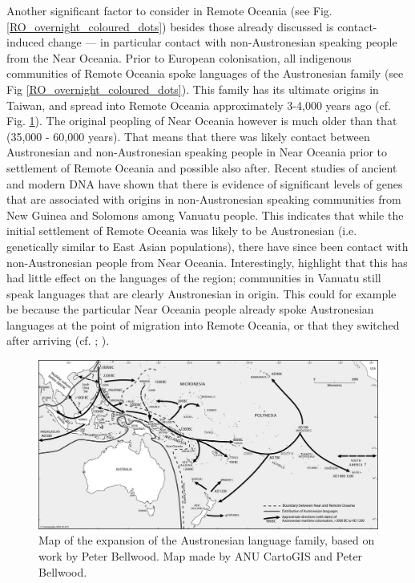 \documentclass[unnumsec,webpdf,modern,medium]{oup-authoring-template}
\begin{document}
Another significant factor to consider in Remote Oceania (see Fig. \ref{RO_overnight_coloured_dots}) besides those already discussed is contact-induced change --- in particular contact with non-Austronesian speaking people from the Near Oceania. Prior to European colonisation, all indigenous communities of Remote Oceania spoke languages of the Austronesian family (see Fig \ref{RO_overnight_coloured_dots}). This family has its ultimate origins in Taiwan, and spread into Remote Oceania approximately 3-4,000 years ago (cf. Fig. \ref{austro_expansion_bellwood}). The original peopling of Near Oceania  however is much older than that (35,000 - 60,000 years). That means that there was likely contact between Austronesian and non-Austronesian speaking people in Near Oceania prior to settlement of Remote Oceania and possible also after. Recent studies of ancient and modern DNA \citep{lipson_harvad_ancient_dna_vanuatu_2018, posth_jena_ancient_dna_vanuatu_2018} have shown that there is evidence of significant levels of genes that are associated with origins in non-Austronesian speaking communities from New Guinea and Solomons among Vanuatu people. This indicates that while the initial settlement of Remote Oceania was likely to be Austronesian (i.e. genetically similar to East Asian populations), there have since been contact with non-Austronesian people from Near Oceania. Interestingly, \citet{posth_jena_ancient_dna_vanuatu_2018} highlight that this has had little effect on the languages of the region; communities in Vanuatu still speak languages that are clearly Austronesian in origin. This could for example be because the particular Near Oceania people already spoke Austronesian languages at the point of migration into Remote Oceania, or that they switched after arriving  (cf. \citet[288, 321]{barlow2023papuan}; \citet[209-210]{bedford2018ancient}).

\begin{figure}[ht]
\centering
\includegraphics[width=\textwidth]{ANU_cartography.jpg}
\caption{Map of the expansion of the Austronesian language family, based on work by Peter Bellwood. Map made by ANU CartoGIS and Peter Bellwood.}
\label{austro_expansion_bellwood}
\end{figure}
\end{document}
